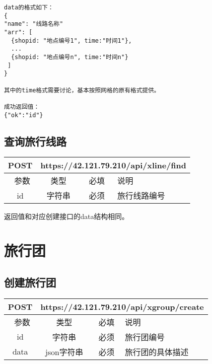 \documentclass[cs4size]{ctexartutf8}
\begin{document}
\begin{verbatim}
data的格式如下：
{
"name": "线路名称"
"arr": [
  {shopid: "地点编号1", time:"时间1"},
  ...
  {shopid: "地点编号n", time:"时间n"}
 ]
}

其中的time格式需要讨论，基本按照网格的原有格式提供。

成功返回值：
{"ok":"id"}
\end{verbatim}



\subsection{查询旅行线路}

\begin{table}[H]
   \begin{center}
\begin{tabular}{|c|c|c|p{12cm}|}
\hline
POST & \multicolumn{3}{|c|}{https://42.121.79.210/api/xline/find} \\
\hline\hline
 \  参数  & 类型 & 必填 &  说明  \\
 \hline
 id  & 字符串 & 必须 &  旅行线路编号\\
\hline
\end{tabular}
   \end{center}
\end{table}

返回值和对应创建接口的data结构相同。



\section{旅行团}

\subsection{创建旅行团}

\begin{table}[H]
   \begin{center}
\begin{tabular}{|c|c|c|p{12cm}|}
\hline
POST & \multicolumn{3}{|c|}{https://42.121.79.210/api/xgroup/create} \\
\hline\hline
 \  参数  & 类型 & 必填 &  说明  \\
 \hline
 id  & 字符串 & 必须 &  旅行团编号\\
\hline
 data  & json字符串 & 必须 &  旅行团的具体描述\\
\hline
\end{tabular}
   \end{center}
\end{table}
\end{document}
